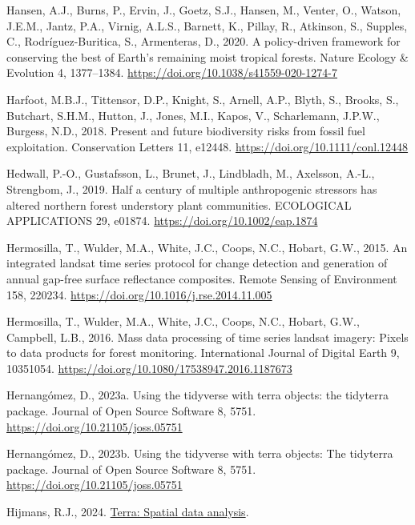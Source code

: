 \documentclass[
]{agujournal2019}
\newlength{\cslhangindent}
\newenvironment{CSLReferences}[2] %
 {\begin{list}{}{%
  \setlength{\itemindent}{0pt}
  \setlength{\leftmargin}{0pt}
  \setlength{\parsep}{0pt}
  \ifodd #1
   \setlength{\leftmargin}{\cslhangindent}
   \setlength{\itemindent}{-1\cslhangindent}
  \fi
  \setlength{\itemsep}{#2\baselineskip}}}
 {\end{list}}
\begin{document}
\begin{CSLReferences}{1}{0}
Hansen, A.J., Burns, P., Ervin, J., Goetz, S.J., Hansen, M., Venter, O.,
Watson, J.E.M., Jantz, P.A., Virnig, A.L.S., Barnett, K., Pillay, R.,
Atkinson, S., Supples, C., Rodríguez-Buritica, S., Armenteras, D., 2020.
A policy-driven framework for conserving the best of Earth{'}s remaining
moist tropical forests. Nature Ecology \& Evolution 4, 1377--1384.
\url{https://doi.org/10.1038/s41559-020-1274-7}

Harfoot, M.B.J., Tittensor, D.P., Knight, S., Arnell, A.P., Blyth, S.,
Brooks, S., Butchart, S.H.M., Hutton, J., Jones, M.I., Kapos, V.,
Scharlemann, J.P.W., Burgess, N.D., 2018. Present and future
biodiversity risks from fossil fuel exploitation. Conservation Letters
11, e12448. \url{https://doi.org/10.1111/conl.12448}

Hedwall, P.-O., Gustafsson, L., Brunet, J., Lindbladh, M., Axelsson,
A.-L., Strengbom, J., 2019. Half a century of multiple anthropogenic
stressors has altered northern forest understory plant communities.
ECOLOGICAL APPLICATIONS 29, e01874.
\url{https://doi.org/10.1002/eap.1874}

Hermosilla, T., Wulder, M.A., White, J.C., Coops, N.C., Hobart, G.W.,
2015. An integrated landsat time series protocol for change detection
and generation of annual gap-free surface reflectance composites. Remote
Sensing of Environment 158, 220234.
\url{https://doi.org/10.1016/j.rse.2014.11.005}

Hermosilla, T., Wulder, M.A., White, J.C., Coops, N.C., Hobart, G.W.,
Campbell, L.B., 2016. Mass data processing of time series landsat
imagery: Pixels to data products for forest monitoring. International
Journal of Digital Earth 9, 10351054.
\url{https://doi.org/10.1080/17538947.2016.1187673}

Hernangómez, D., 2023a. Using the tidyverse with terra objects: the
tidyterra package. Journal of Open Source Software 8, 5751.
\url{https://doi.org/10.21105/joss.05751}

Hernangómez, D., 2023b. Using the {tidyverse} with {terra} objects: The
{tidyterra} package. Journal of Open Source Software 8, 5751.
\url{https://doi.org/10.21105/joss.05751}

Hijmans, R.J., 2024. \href{https://rspatial.org/}{Terra: Spatial data
analysis}.


\end{CSLReferences}
\end{document}
